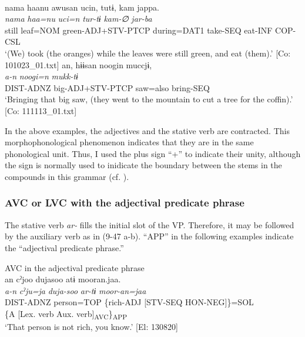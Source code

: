 \ex{}\\
    \glll  nama  haanu  awusan  ucin,  tutɨ,  kam  jappa.\\
      \textit{nama}  \textit{haa=nu}  \textit{}  \textit{uci=n}  \textit{tur-tɨ}  \textit{kam-∅}  \textit{jar-ba}\\
      still  leaf=NOM  green-ADJ+STV-PTCP  during=DAT1  take-SEQ  eat-INF  COP-CSL\\
      \glt       ‘(We) took (the oranges) while the leaves were still green, and eat (them).’ [Co: 101023\_01.txt]
\ex %
\glll an,  hɨɨsan  noogin  muccjɨ,\\
      \textit{a-n}  \textit{}  \textit{noogi=n}  \textit{mukk-tɨ}\\
      DIST-ADNZ  big-ADJ+STV-PTCP  saw=also  bring-SEQ\\
      \glt       ‘Bringing that big saw, (they went to the mountain to cut a tree for the coffin).’ [Co: 111113\_01.txt]
    \z
\z

In the above examples, the adjectives and the stative verb are contracted. This morphophonological phenomenon indicates that they are in the same phonological unit. Thus, I used the plus sign “+” to indicate their unity, although the sign is normally used to inidicate the boundary between the stems in the compounds in this grammar (cf. ).

\subsubsection{AVC or LVC with the adjectival predicate phrase}\label{sec:9.2.2.3}

The stative verb \textit{ar-} fills the initial slot of the VP. Therefore, it may be followed by the auxiliary verb as in (9-47 a-b). “APP” in the following examples indicate the “adjectival predicate phrase.”

\ea   AVC in the adjectival predicate phrase \label{ex:9.47}
\ea\relax [= (8-48)]\\
    \gllll  an  cˀjoo  dujasoo  atɨ  mooran.jaa.\\
      \textit{a-n}  \textit{cˀju=ja}  \textit{duja-soo}  \textit{ar-tɨ}  \textit{moor-an=jaa}\\
      DIST-ADNZ  person=TOP  \{rich-ADJ  [STV-SEQ  HON-NEG]\}=SOL\\
          \{A  [Lex. verb  Aux. verb]\textsubscript{AVC}\}\textsubscript{APP}\\
      \glt       ‘That person is not rich, you know.’ [El: 130820]


